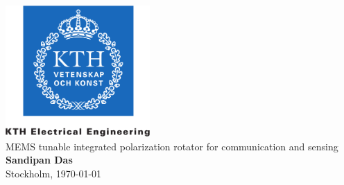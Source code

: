 \documentclass[../report.tex]{subfiles}
\begin{document}
	
    \begin{titlepage}
        \thispagestyle{empty}
        \begin{center}
            \includegraphics[height=5cm]{./Ch0.2-Title/kth_cmyk_info_comm_tech}\\
            \vspace{2.5cm}
            \huge{MEMS tunable integrated polarization rotator for communication and sensing}\\
            \vspace{4cm}
            \Large{\textbf{Sandipan Das}}\\
            \vspace{4cm}
            \Large{Stockholm, \today}
        \end{center} 
    \end{titlepage}
\end{document}
